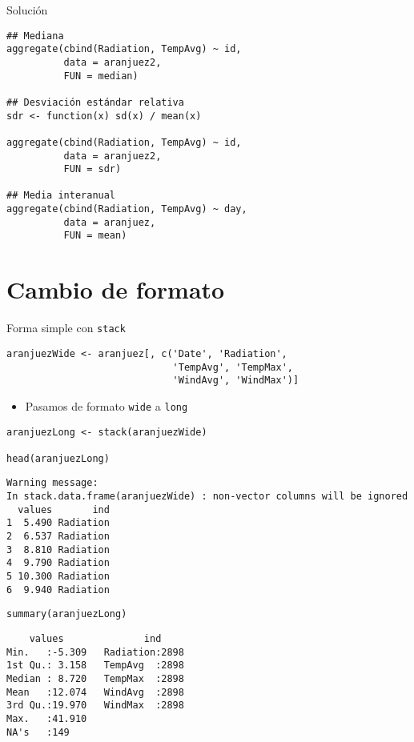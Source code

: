 \documentclass[xcolor={usenames,svgnames,dvipsnames}]{beamer}
\begin{document}
\begin{frame}[label={sec:orgba5fcfa},fragile]{Solución}
 \lstset{language=r,label= ,caption= ,captionpos=b,numbers=none}
\begin{lstlisting}
## Mediana
aggregate(cbind(Radiation, TempAvg) ~ id,
          data = aranjuez2,
          FUN = median)

## Desviación estándar relativa
sdr <- function(x) sd(x) / mean(x)

aggregate(cbind(Radiation, TempAvg) ~ id,
          data = aranjuez2,
          FUN = sdr)

## Media interanual
aggregate(cbind(Radiation, TempAvg) ~ day,
          data = aranjuez,
          FUN = mean)
\end{lstlisting}
\end{frame}

\section{Cambio de formato}
\label{sec:org4e90043}
\begin{frame}[label={sec:org097d986},fragile]{Forma simple con \texttt{stack}}
 \lstset{language=r,label= ,caption= ,captionpos=b,numbers=none}
\begin{lstlisting}
aranjuezWide <- aranjuez[, c('Date', 'Radiation',
                             'TempAvg', 'TempMax',
                             'WindAvg', 'WindMax')]
\end{lstlisting}

\begin{itemize}
\item Pasamos de formato \texttt{wide} a \texttt{long}
\end{itemize}
\lstset{language=r,label= ,caption= ,captionpos=b,numbers=none}
\begin{lstlisting}
aranjuezLong <- stack(aranjuezWide)

head(aranjuezLong)
\end{lstlisting}

\begin{verbatim}
Warning message:
In stack.data.frame(aranjuezWide) : non-vector columns will be ignored
  values       ind
1  5.490 Radiation
2  6.537 Radiation
3  8.810 Radiation
4  9.790 Radiation
5 10.300 Radiation
6  9.940 Radiation
\end{verbatim}


\lstset{language=r,label= ,caption= ,captionpos=b,numbers=none}
\begin{lstlisting}
summary(aranjuezLong)
\end{lstlisting}

\begin{verbatim}
    values              ind      
Min.   :-5.309   Radiation:2898  
1st Qu.: 3.158   TempAvg  :2898  
Median : 8.720   TempMax  :2898  
Mean   :12.074   WindAvg  :2898  
3rd Qu.:19.970   WindMax  :2898  
Max.   :41.910                   
NA's   :149
\end{verbatim}
\end{frame}
\end{document}
